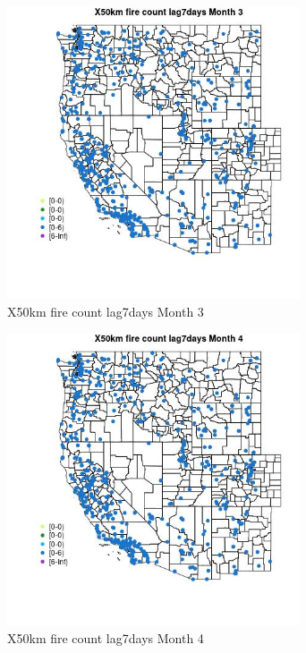 \begin{figure} 
\centering  
\includegraphics[width=0.77\textwidth]{Code_Outputs/Report_ML_input_PM25_Step4_part_e_de_duplicated_aves_compiled_2019-05-14wNAs_MapObsMo3X50km_fire_count_lag7days.jpg} 
\caption{\label{fig:Report_ML_input_PM25_Step4_part_e_de_duplicated_aves_compiled_2019-05-14wNAsMapObsMo3X50km_fire_count_lag7days}X50km fire count lag7days Month 3} 
\end{figure} 
 

\begin{figure} 
\centering  
\includegraphics[width=0.77\textwidth]{Code_Outputs/Report_ML_input_PM25_Step4_part_e_de_duplicated_aves_compiled_2019-05-14wNAs_MapObsMo4X50km_fire_count_lag7days.jpg} 
\caption{\label{fig:Report_ML_input_PM25_Step4_part_e_de_duplicated_aves_compiled_2019-05-14wNAsMapObsMo4X50km_fire_count_lag7days}X50km fire count lag7days Month 4} 
\end{figure} 
 

